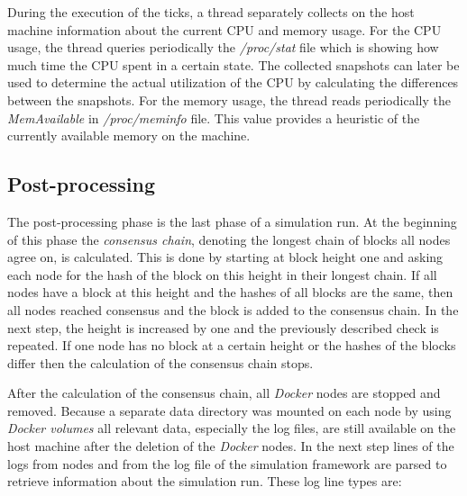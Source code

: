 During the execution of the ticks, a thread separately collects on the host machine information about the current CPU and memory usage.
For the CPU usage, the thread queries periodically the \textit{/proc/stat} file which is showing how much time the CPU spent in a certain state. 
The collected snapshots can later be used to determine the actual utilization of the CPU by calculating the differences between the snapshots.
For the memory usage, the thread reads periodically the \textit{MemAvailable} in \textit{/proc/meminfo} file.
This value provides a heuristic of the currently available memory on the machine.

\subsection{Post-processing}

The post-processing phase is the last phase of a simulation run.
At the beginning of this phase the \emph{consensus chain}, denoting the longest chain of blocks all nodes agree on, is calculated.
This is done by starting at block height one and asking each node for the hash of the block on this height in their longest chain.
If all nodes have a block at this height and the hashes of all blocks are the same, then all nodes reached consensus and the block is added to the consensus chain.
In the next step, the height is increased by one and the previously described check is repeated.
If one node has no block at a certain height or the hashes of the blocks differ then the calculation of the consensus chain stops.

After the calculation of the consensus chain, all \textit{Docker} nodes are stopped and removed.
Because a separate data directory was mounted on each node by using \textit{Docker volumes} all relevant data, especially the log files, are still available on the host machine after the deletion of the \textit{Docker} nodes.
In the next step lines of the logs from nodes and from the log file of the simulation framework are parsed to retrieve information about the simulation run.
These log line types are:

